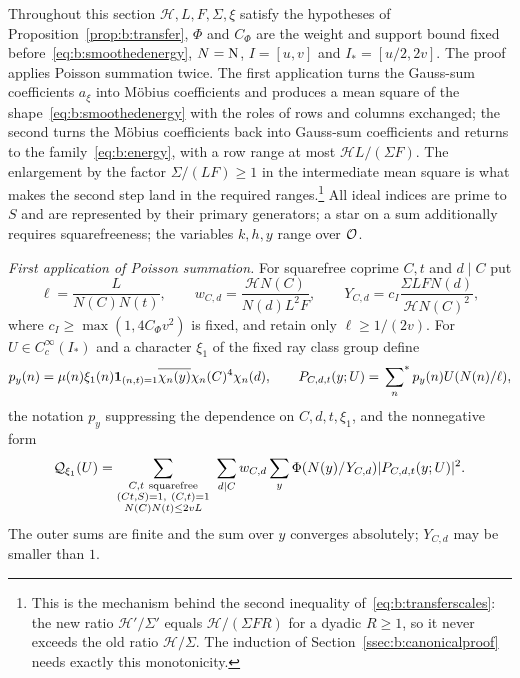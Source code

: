 Throughout this section $\mathcal H,L,F,\Sigma,\xi$ satisfy the hypotheses of Proposition~\ref{prop:b:transfer}, $\Phi$ and $C_\Phi$ are the weight and support bound fixed before~\eqref{eq:b:smoothedenergy}, $N=\mathrm{N}$, $I=[u,v]$ and $I_*=[u/2,2v]$. The proof applies Poisson summation twice. The first application turns the Gauss-sum coefficients $a_\xi$ into M\"obius coefficients and produces a mean square of the shape~\eqref{eq:b:smoothedenergy} with the roles of rows and columns exchanged; the second turns the M\"obius coefficients back into Gauss-sum coefficients and returns to the family~\eqref{eq:b:energy}, with a row range at most $\mathcal HL/(\Sigma F)$. The enlargement by the factor $\Sigma/(LF)\ge1$ in the intermediate mean square is what makes the second step land in the required ranges.\footnote{This is the mechanism behind the second inequality of~\eqref{eq:b:transferscales}: the new ratio $\mathcal H'/\Sigma'$ equals $\mathcal H/(\Sigma FR)$ for a dyadic $R\ge1$, so it never exceeds the old ratio $\mathcal H/\Sigma$. The induction of Section~\ref{ssec:b:canonicalproof} needs exactly this monotonicity.} All ideal indices are prime to $S$ and are represented by their primary generators; a star on a sum additionally requires squarefreeness; the variables $k,h,y$ range over $\mathcal{O}$.

\emph{First application of Poisson summation.} For squarefree coprime $C,t$ and $d\mid C$ put
\[
  \ell=\frac L{N(C)N(t)},\qquad w_{C,d}=\frac{\mathcal HN(C)}{N(d)L^2F},\qquad Y_{C,d}=c_I\frac{\Sigma LFN(d)}{\mathcal HN(C)^2},
\]
where $c_I\ge\max(1,4C_\Phi v^2)$ is fixed, and retain only $\ell\ge1/(2v)$. For $U\in C_c^\infty(I_*)$ and a character $\xi_1$ of the fixed ray class group define
\begin{equation}\label{eq:b:P}
  p_y(n)=\mu(n)\xi_1(n)\mathbf{1}_{(n,t)=1}\overline{\chi_n(y)}\chi_n(C)^4\chi_n(d),\qquad P_{C,d,t}(y;U)=\sideset{}{^*}\sum_np_y(n)U(N(n)/\ell),
\end{equation}
the notation $p_y$ suppressing the dependence on $C,d,t,\xi_1$, and the nonnegative form
\begin{equation}\label{eq:b:firsttransferform}
  \mathcal Q_{\xi_1}(U)=\sum_{\substack{C,t\ {\rm squarefree}\\(Ct,S)=1,\ (C,t)=1\\N(C)N(t)\le2vL}}\ \sum_{d\mid C}w_{C,d}\sum_y\Phi(N(y)/Y_{C,d})|P_{C,d,t}(y;U)|^2.
\end{equation}
The outer sums are finite and the sum over $y$ converges absolutely; $Y_{C,d}$ may be smaller than $1$.


